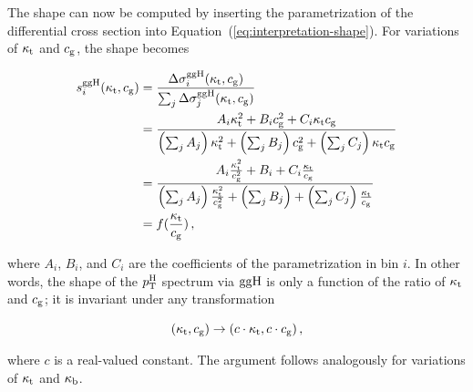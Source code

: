 The shape can now be computed by inserting the parametrization of the differential cross section into Equation~(\ref{eq:interpretation-shape}).
% 
For variations of $\kappa_{\mathrm{t}}$ and $c_\mathrm{g}$, the shape becomes
% 
\begin{linenomath*}
\begin{equation}
\label{eq:interpretation-shape-ktcg}
\begin{split}
s^{\mathrm{g}\mathrm{g}\mathrm{H}}_i(\kappa_{\mathrm{t}}, c_\mathrm{g})
        &=
        \frac
            {\Delta\sigma^{\mathrm{g}\mathrm{g}\mathrm{H}}_i(\kappa_{\mathrm{t}}, c_\mathrm{g})}
            {\sum_j \Delta\sigma^{\mathrm{g}\mathrm{g}\mathrm{H}}_j(\kappa_{\mathrm{t}}, c_\mathrm{g})}
            \\
        &=
        \frac
            {A_i \kappa_{\mathrm{t}}^2 + B_i c_\mathrm{g}^2 + C_i \kappa_{\mathrm{t}} c_\mathrm{g}}
            {
                \left(\sum_j A_j\right) \kappa_{\mathrm{t}}^2
                + \left(\sum_j B_j\right) c_\mathrm{g}^2
                + \left(\sum_j C_j\right) \kappa_{\mathrm{t}}c_\mathrm{g}
                }
            \\
        &= 
        \frac
            {A_i \frac{\kappa_{\mathrm{t}}^2}{c_\mathrm{g}^2} + B_i + C_i \frac{\kappa_{\mathrm{t}}}{c_\mathrm{g}}}
            {
                \left(\sum_j A_j\right) \frac{\kappa_{\mathrm{t}}^2}{c_\mathrm{g}^2}
                + \left(\sum_j B_j\right) 
                + \left(\sum_j C_j\right) \frac{\kappa_{\mathrm{t}}}{c_\mathrm{g}}
                }
            \\
        & = f(\frac{\kappa_{\mathrm{t}}}{c_\mathrm{g}})
\,,
\end{split}
\end{equation}
\end{linenomath*}
% 
where $A_i$, $B_i$, and $C_i$ are the coefficients of the parametrization in bin $i$.
% 
In other words, the shape of the $p_\mathrm{T}^\mathrm{H}$ spectrum via $\mathrm{g}\mathrm{g}\mathrm{H}$ is only a function of the ratio of $\kappa_{\mathrm{t}}$ and $c_\mathrm{g}$; it is invariant under any transformation
% 
\begin{linenomath*}
\begin{equation}
\label{eq:interpretation-ktcg-transform}
(\kappa_{\mathrm{t}}, c_\mathrm{g}) \to (c \cdot \kappa_{\mathrm{t}}, c \cdot c_\mathrm{g})
\,,
\end{equation}
\end{linenomath*}
% 
where $c$ is a real-valued constant.
% 
The argument follows analogously for variations of $\kappa_{\mathrm{t}}$ and $\kappa_{\mathrm{b}}$.


